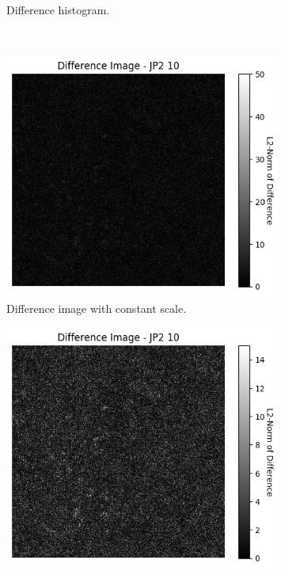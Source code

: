 \begin{figure}[htb]
\begin{subfigure}[b]{0.48\textwidth}
        \caption{Difference histogram.}
        \label{fig:img_quality_comp_jp2_10_center_histo}
    \end{subfigure}
    \\
    \begin{subfigure}[b]{0.48\textwidth}
        \centering
        \includegraphics[width=\textwidth]{doc/thesis/0_figures/compare_quality/set1/jp2_10_center_diff_heatmap.png}
        \caption{Difference image with constant scale.}
        \label{fig:img_quality_comp_jp2_10_center_diff}
    \end{subfigure}
    \begin{subfigure}[b]{0.48\textwidth}
        \centering
        \includegraphics[width=\textwidth]{doc/thesis/0_figures/compare_quality/set1/jp2_10_center_diff_heatmap_rel.png}

\end{subfigure}
\end{figure}
